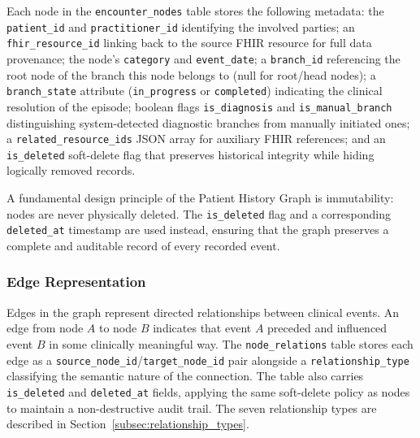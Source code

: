 Each node in the \texttt{encounter\_nodes} table stores the following metadata:
the \texttt{patient\_id} and \texttt{practitioner\_id} identifying the involved
parties; an \texttt{fhir\_resource\_id} linking back to the source FHIR resource
for full data provenance; the node's \texttt{category} and \texttt{event\_date};
a \texttt{branch\_id} referencing the root node of the branch this node belongs
to (null for root/head nodes); a \texttt{branch\_state} attribute
(\texttt{in\_progress} or \texttt{completed}) indicating the clinical resolution
of the episode; boolean flags \texttt{is\_diagnosis} and
\texttt{is\_manual\_branch} distinguishing system-detected diagnostic branches
from manually initiated ones; a \texttt{related\_resource\_ids} JSON array for
auxiliary FHIR references; and an \texttt{is\_deleted} soft-delete flag that
preserves historical integrity while hiding logically removed records.

A fundamental design principle of the Patient History Graph is immutability:
nodes are never physically deleted. The \texttt{is\_deleted} flag and a
corresponding \texttt{deleted\_at} timestamp are used instead, ensuring that the
graph preserves a complete and auditable record of every recorded event.

\subsubsection{Edge Representation}
Edges in the graph represent directed relationships between clinical events. An
edge from node $A$ to node $B$ indicates that event $A$ preceded and influenced
event $B$ in some clinically meaningful way. The \texttt{node\_relations} table
stores each edge as a \texttt{source\_node\_id}/\texttt{target\_node\_id} pair
alongside a \texttt{relationship\_type} classifying the semantic nature of the
connection. The table also carries \texttt{is\_deleted} and \texttt{deleted\_at}
fields, applying the same soft-delete policy as nodes to maintain a
non-destructive audit trail. The seven relationship types are described in
Section~\ref{subsec:relationship_types}.



